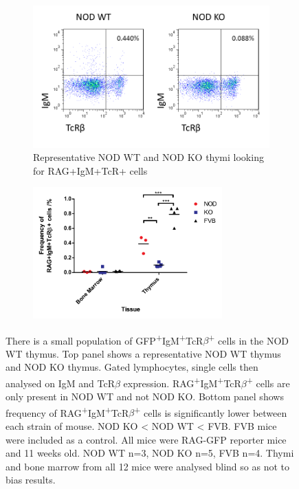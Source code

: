 \begin{figure}
	\begin{subfigure}{\textwidth}
	\includegraphics[width=\textwidth]{Figures/ThyRAGIgMTcR.png}
	\caption{Representative NOD WT and NOD KO thymi looking for RAG+IgM+TcR+ cells}
	\label{subfig:BMvThyRAGIgMTcR}
	\end{subfigure}
	\begin{subfigure}{\textwidth}
	\centering
	\includegraphics[width=0.8\textwidth]{Figures/IgMTcRposgraph.pdf}
	\caption{}
	\label{subfig:IgMTcRposgraph}
	\end{subfigure}
\caption[There is a very small population of IgM\textsuperscript{+}TcR$\beta$\textsuperscript{+} cells in the NOD thymus]{There is a small population of GFP\textsuperscript{+}IgM\textsuperscript{+}TcR$\beta$\textsuperscript{+} cells in the NOD WT thymus. 
Top panel shows a representative NOD WT thymus and NOD KO thymus.
Gated lymphocytes, single cells then analysed on IgM and TcR$\beta$ expression.
RAG\textsuperscript{+}IgM\textsuperscript{+}TcR$\beta$\textsuperscript{+} cells are only present in NOD WT and not NOD KO.
Bottom panel shows frequency of RAG\textsuperscript{+}IgM\textsuperscript{+}TcR$\beta$\textsuperscript{+} cells is significantly lower between each strain of mouse. NOD KO < NOD WT < FVB. FVB mice were included as a control.
All mice were RAG-GFP reporter mice and 11 weeks old. NOD WT n=3, NOD KO n=5, FVB n=4.
Thymi and bone marrow from all 12 mice were analysed blind so as not to bias results.}
\label{fig:RAGIgMTcRpos}
\end{figure}

